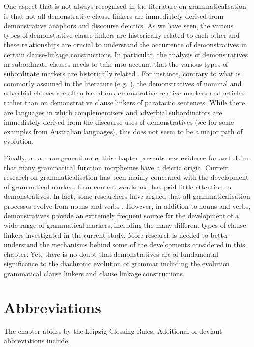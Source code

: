 \documentclass[output=paper,colorlinks,citecolor=brown]{langscibook}
\begin{document}
One aspect that is not always recognised in the literature on grammaticalisation is that not all demonstrative clause linkers are immediately derived from demonstrative anaphors and discourse deictics. As we have seen, the various types of demonstrative clause linkers are historically related to each other and these relationships are crucial to understand the occurrence of demonstratives in certain clause-linkage constructions. In particular, the analysis of demonstratives in subordinate clauses needs to take into account that the various types of subordinate markers are historically related \citep{SchmidtkeBode2014,Diessel2019Network}. For instance, contrary to what is commonly assumed in the literature (e.g. \citealt[184-185]{HopperTraugott2003}), the demonstratives of nominal and adverbial clauses are often based on demonstrative relative markers and articles rather than on demonstrative clause linkers of paratactic sentences. While there are languages in which complementisers and adverbial subordinators are immediately derived from the discourse uses of demonstratives (see \citealt{McConvell2006} for some examples from Australian languages), this does not seem to be a major path of evolution. 

Finally, on a more general note, this chapter presents new evidence for  and  claim that many grammatical function morphemes have a deictic origin. Current research on grammaticalisation has been mainly concerned with the development of grammatical markers from content words and has paid little attention to demonstratives. In fact, some researchers have argued that all grammaticalisation processes evolve from nouns and verbs \citep[111]{HeineKuteva2007}. However, in addition to nouns and verbs, demonstratives provide an extremely frequent source for the development of a wide range of grammatical markers, including the many different types of clause linkers investigated in the current study. More research is needed to better understand the mechanisms behind some of the developments considered in this chapter. Yet, there is no doubt that demonstratives are of fundamental significance to the diachronic evolution of grammar including the evolution grammatical clause linkers and clause linkage constructions.

\section*{Abbreviations}

The chapter abides by the Leipzig Glossing Rules. Additional or deviant abbreviations include:
\end{document}
